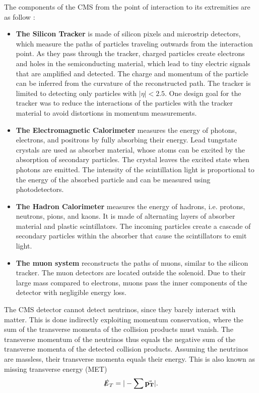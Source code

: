 The components of the CMS from the point of interaction to its extremities are as follow \cite{Bayatian:922757}:
\begin{itemize}
    \item \textbf{The Silicon Tracker} is made of silicon pixels and microstrip detectors, which measure the paths of particles traveling outwards from the interaction point. As they pass through the tracker, charged particles create electrons and holes in the semiconducting material, which lead to tiny electric signals that are amplified and detected. The charge and momentum of the particle can be inferred from the curvature of the reconstructed path. The tracker is limited to detecting only particles with $|\eta|<2.5$. One design goal for the tracker was to reduce the interactions of the particles with the tracker material to avoid distortions in momentum measurements.
    \item \textbf{The Electromagnetic Calorimeter} measures the energy of photons, electrons, and positrons by fully absorbing their energy. Lead tungstate crystals are used as absorber material, whose atoms can be excited by the absorption of secondary particles. The crystal leaves the excited state when photons are emitted. The intensity of the scintillation light is proportional to the energy of the absorbed particle and can be measured using photodetectors.
    \item \textbf{The Hadron Calorimeter} measures the energy of hadrons, i.e. protons, neutrons, pions, and kaons. It is made of alternating layers of absorber material and plastic scintillators. The incoming particles create a cascade of secondary particles within the absorber that cause the scintillators to emit light.
    \item \textbf{The muon system} reconstructs the paths of muons, similar to the silicon tracker. The muon detectors are located outside the solenoid. Due to their large mass compared to electrons, muons pass the inner components of the detector with negligible energy loss.
\end{itemize}

The CMS detector cannot detect neutrinos, since they barely interact with matter. This is done indirectly exploiting momentum conservation, where the sum of the transverse momenta of the collision products must vanish. The transverse momentum of the neutrinos thus equals the negative sum of the transverse momenta of the detected collision products. Assuming the neutrinos are massless, their transverse momenta equals their energy. This is also known as missing transverse energy (MET)
\begin{equation}
\slashed{E}_T=|-\sum{\va{p_T}}|.
\end{equation}

